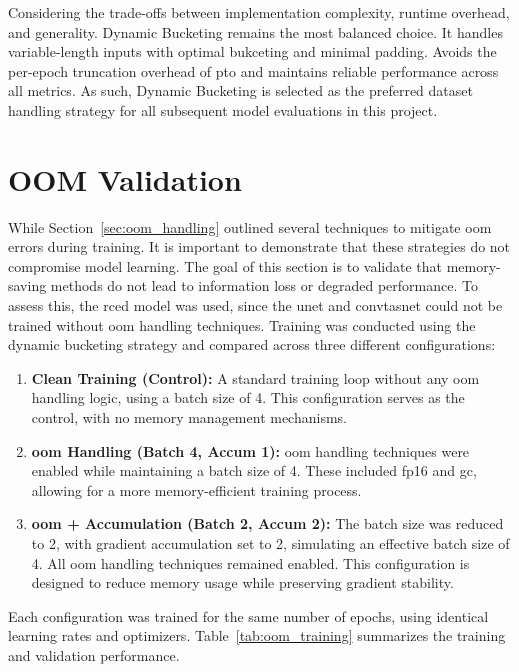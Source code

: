 Considering the trade-offs between implementation complexity, runtime overhead, and generality. Dynamic Bucketing remains the most balanced choice. It handles variable-length inputs with optimal bukceting and minimal padding. Avoids the per-epoch truncation overhead of \gls{pto} and maintains reliable performance across all metrics. As such, Dynamic Bucketing is selected as the preferred dataset handling strategy for all subsequent model evaluations in this project.

\section{OOM Validation}
\label{sec:oom_validation}

While Section~\ref{sec:oom_handling} outlined several techniques to mitigate \gls{oom} errors during training. It is important to demonstrate that these strategies do not compromise model learning. The goal of this section is to validate that memory-saving methods do not lead to information loss or degraded performance. To assess this, the \gls{rced} model was used, since the \gls{unet} and \gls{convtasnet} could not be trained without \gls{oom} handling techniques. Training was conducted using the dynamic bucketing strategy and compared across three different configurations:

\begin{enumerate}
    \item \textbf{Clean Training (Control):} A standard training loop without any \gls{oom} handling logic, using a batch size of 4. This configuration serves as the control, with no memory management mechanisms.
    
    \item \textbf{\gls{oom} Handling (Batch 4, Accum 1):} \gls{oom} handling techniques were enabled while maintaining a batch size of 4. These included \gls{fp16} and \gls{gc}, allowing for a more memory-efficient training process.
    
    \item \textbf{\gls{oom} + Accumulation (Batch 2, Accum 2):} The batch size was reduced to 2, with gradient accumulation set to 2, simulating an effective batch size of 4. All \gls{oom} handling techniques remained enabled. This configuration is designed to reduce memory usage while preserving gradient stability.
\end{enumerate}

Each configuration was trained for the same number of epochs, using identical learning rates and optimizers. Table~\ref{tab:oom_training} summarizes the training and validation performance.

